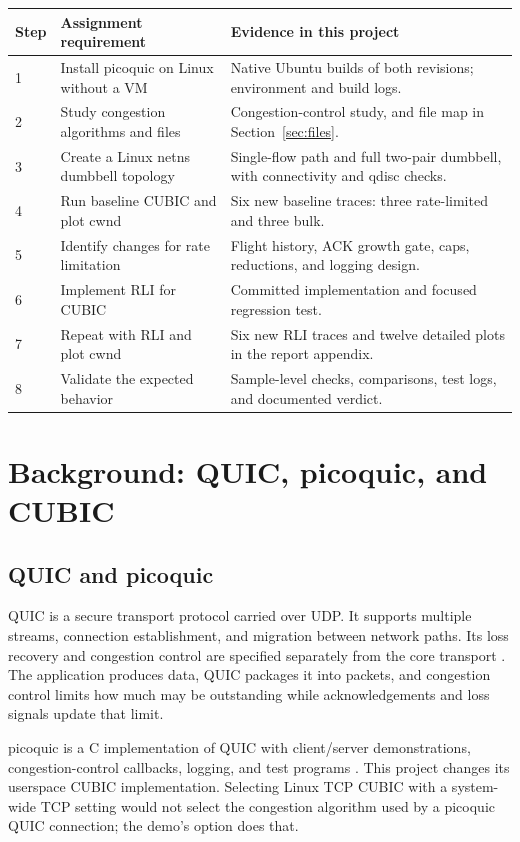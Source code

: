 \documentclass[11pt,a4paper]{article}
\newcommand{\code}[1]{\texttt{\detokenize{#1}}}
\begin{document}
\begin{longtable}{p{}p{}p{}}
\toprule Step & Assignment requirement & Evidence in this project\\\midrule
\endhead
1 & Install picoquic on Linux without a VM & Native Ubuntu builds of both revisions; environment and build logs.\\
2 & Study congestion algorithms and files & Congestion-control study, and file map in Section~\ref{sec:files}.\\
3 & Create a Linux netns dumbbell topology & Single-flow path and full two-pair dumbbell, with connectivity and qdisc checks.\\
4 & Run baseline CUBIC and plot cwnd & Six new baseline traces: three rate-limited and three bulk.\\
5 & Identify changes for rate limitation & Flight history, ACK growth gate, caps, reductions, and logging design.\\
6 & Implement RLI for CUBIC & Committed implementation and focused regression test.\\
7 & Repeat with RLI and plot cwnd & Six new RLI traces and twelve detailed plots in the report appendix.\\
8 & Validate the expected behavior & Sample-level checks, comparisons, test logs, and documented verdict.\\
\bottomrule
\end{longtable}

\section{Background: QUIC, picoquic, and CUBIC}
\subsection{QUIC and picoquic}
QUIC is a secure transport protocol carried over UDP. It supports multiple
streams, connection establishment, and migration between network paths.
Its loss recovery and congestion control are specified separately from the
core transport \cite{quic,quiccc}. The application produces data, QUIC
packages it into packets, and congestion control limits how much may be
outstanding while acknowledgements and loss signals update that limit.

picoquic is a C implementation of QUIC with client/server demonstrations,
congestion-control callbacks, logging, and test programs \cite{picoquic}.
This project changes its userspace CUBIC implementation. Selecting Linux
TCP CUBIC with a system-wide TCP setting would not select the congestion
algorithm used by a picoquic QUIC connection; the demo's \code{-G cubic}
option does that.
\end{document}
